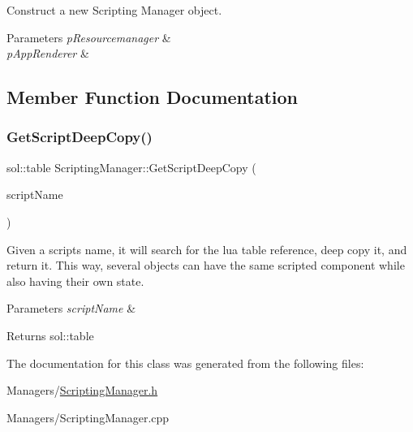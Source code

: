 Construct a new Scripting Manager object. 


\begin{DoxyParams}{Parameters}
{\em p\+Resourcemanager} & \\
\hline
{\em p\+App\+Renderer} & \\
\hline
\end{DoxyParams}


\subsection{Member Function Documentation}
\mbox{\label{classScriptingManager_a11b9b6914dd4f5c2daa8ece918e0131c}} 
\subsubsection{\texorpdfstring{Get\+Script\+Deep\+Copy()}{GetScriptDeepCopy()}}
{\footnotesize\ttfamily sol\+::table Scripting\+Manager\+::\+Get\+Script\+Deep\+Copy (\begin{DoxyParamCaption}\item[{\hyperlink{classStringId}{String\+Id}}]{script\+Name }\end{DoxyParamCaption})}



Given a script\textquotesingle{}s name, it will search for the lua table reference, deep copy it, and return it. This way, several objects can have the same scripted component while also having their own state. 


\begin{DoxyParams}{Parameters}
{\em script\+Name} & \\
\hline
\end{DoxyParams}
\begin{DoxyReturn}{Returns}
sol\+::table 
\end{DoxyReturn}


The documentation for this class was generated from the following files\+:\begin{DoxyCompactItemize}
\item 
Managers/\hyperlink{ScriptingManager_8h}{Scripting\+Manager.\+h}\item 
Managers/Scripting\+Manager.\+cpp\end{DoxyCompactItemize}
